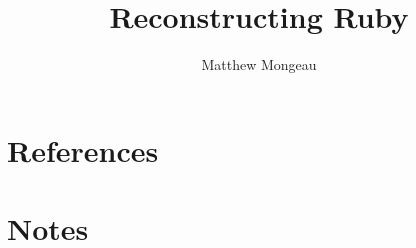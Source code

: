 \documentclass[oneside]{book}
\date{}
\begin{document}
\title{Reconstructing Ruby}
\author{Matthew Mongeau}
\maketitle

\frontmatter
\tableofcontents


\mainmatter




\appendix
\chapter{References}

\backmatter
\chapter{Notes}
\end{document}
